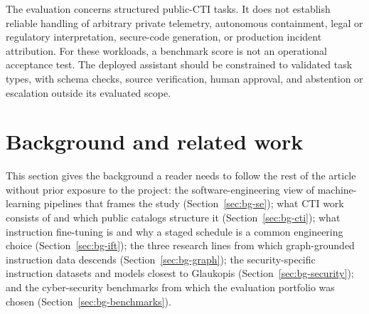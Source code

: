 \documentclass[a4paper,fleqn]{cas-dc}
\begin{document}
The evaluation concerns structured public-CTI tasks. It does not establish reliable handling of arbitrary private telemetry, autonomous containment, legal or regulatory interpretation, secure-code generation, or production incident attribution. For these workloads, a benchmark score is not an operational acceptance test. The deployed assistant should be constrained to validated task types, with schema checks, source verification, human approval, and abstention or escalation outside its evaluated scope.

\section{Background and related work}\label{sec:related}
This section gives the background a reader needs to follow the rest of the article without prior exposure to the project: the software-engineering view of machine-learning pipelines that frames the study (Section~\ref{sec:bg-se}); what CTI work consists of and which public catalogs structure it (Section~\ref{sec:bg-cti}); what instruction fine-tuning is and why a staged schedule is a common engineering choice (Section~\ref{sec:bg-ift}); the three research lines from which graph-grounded instruction data descends (Section~\ref{sec:bg-graph}); the security-specific instruction datasets and models closest to Glaukopis (Section~\ref{sec:bg-security}); and the cyber-security benchmarks from which the evaluation portfolio was chosen (Section~\ref{sec:bg-benchmarks}).
\end{document}
